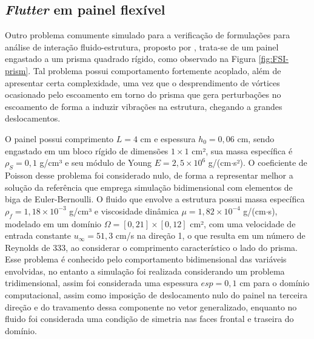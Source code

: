 \newpage
\subsection{\textit{Flutter} em painel flexível} \label{FSI-prism}

Outro problema comumente simulado para a verificação de formulações para análise de interação fluido-estrutura, proposto por , trata-se de um painel engastado a um prisma quadrado rígido, como observado na Figura \ref{fig:FSI-prism}. Tal problema possui comportamento fortemente acoplado, além de apresentar certa complexidade, uma vez que o desprendimento de vórtices ocasionado pelo escoamento em torno do prisma que gera perturbações no escoamento de forma a induzir vibrações na estrutura, chegando a grandes deslocamentos.

O painel possui comprimento $L=4$ cm e espessura $h_0=0,06$ cm, sendo engastado em um bloco rígido de dimensões $1\times 1$ cm², sua massa específica é $\rho_S=0,1$ g/cm³ e seu módulo de Young $E=2,5\times 10^6$ g/(cm$\cdot$s²). O coeficiente de Poisson desse problema foi considerado nulo, de forma a representar melhor a solução da referência que emprega simulação bidimensional com elementos de biga de  Euler-Bernoulli. O fluido que envolve a estrutura possui massa específica $\rho_f=1,18\times10^{-3}$ g/cm³ e viscosidade dinâmica $\mu=1,82\times10^{-4}$ g/(cm$\cdot$s), modelado em um domínio $\Omega=[0,21]\times[0,12]$ cm², com uma velocidade de entrada constante $u_\infty=51,3$ cm/s na direção 1, o que resulta em um número de Reynolds de $333$, ao considerar o comprimento característico o lado do prisma. Esse problema é conhecido pelo comportamento bidimensional das variáveis envolvidas, no entanto a simulação foi realizada considerando um problema tridimensional, assim foi considerada uma espessura $esp=0,1$ cm para o domínio computacional, assim como imposição de deslocamento nulo do painel na terceira direção e do travamento dessa componente no vetor generalizado, enquanto no fluido foi considerada uma condição de simetria nas faces frontal e traseira do domínio.

